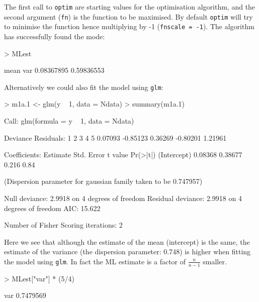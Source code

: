 \documentclass{article}
\begin{document}
\iftalk
\else
\fi

The first call to \texttt{optim} are starting values for the optimisation algorithm, and the second argument (\texttt{fn}) is the function to be maximised. By default \texttt{optim} will try to minimise the function hence multiplying by -1 (\texttt{fnscale = -1}).  The algorithm has successfully found the mode:

\begin{Schunk}
\begin{Sinput}
> MLest
\end{Sinput}
\begin{Soutput}
      mean        var 
0.08367895 0.59836553 
\end{Soutput}
\end{Schunk}

Alternatively we could also fit the model using \texttt{glm}:

\begin{Schunk}
\begin{Sinput}
> m1a.1 <- glm(y ~ 1, data = Ndata)
> summary(m1a.1)
\end{Sinput}
\begin{Soutput}
Call:
glm(formula = y ~ 1, data = Ndata)

Deviance Residuals: 
       1         2         3         4         5  
 0.07093  -0.85123   0.36269  -0.80201   1.21961  

Coefficients:
            Estimate Std. Error t value Pr(>|t|)
(Intercept)  0.08368    0.38677   0.216     0.84

(Dispersion parameter for gaussian family taken to be 0.747957)

    Null deviance: 2.9918  on 4  degrees of freedom
Residual deviance: 2.9918  on 4  degrees of freedom
AIC: 15.622

Number of Fisher Scoring iterations: 2
\end{Soutput}
\end{Schunk}
 
Here we see that although the estimate of the mean (intercept) is the same, the estimate of the variance (the dispersion parameter: 0.748) is higher when fitting the model using \texttt{glm}. In fact the ML estimate is a factor of $\frac{n}{n-1}$ smaller.

\begin{Schunk}
\begin{Sinput}
> MLest["var"] * (5/4)
\end{Sinput}
\begin{Soutput}
      var 
0.7479569 
\end{Soutput}
\end{Schunk}
\end{document}
